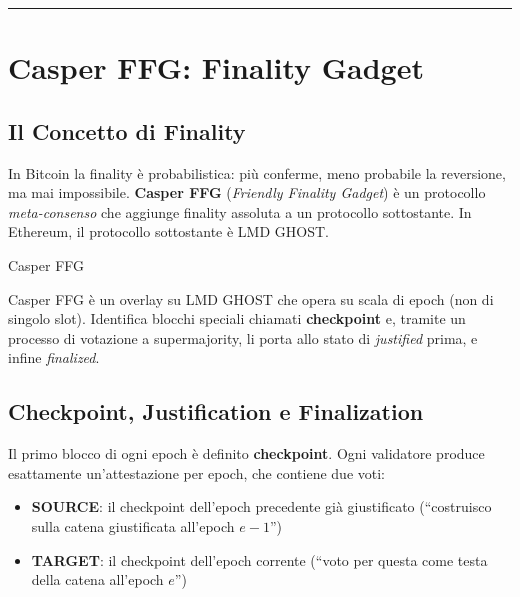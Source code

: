 \documentclass[
  italian,
  openany]{book}
\providecommand{\tightlist}{%
  \setlength{\itemsep}{0pt}\setlength{\parskip}{0pt}}
\begin{document}
\begin{center}\rule{0.5\linewidth}{0.5pt}\end{center}

\section{Casper FFG: Finality Gadget}\label{casper-ffg-finality-gadget}

\subsection{Il Concetto di Finality}\label{il-concetto-di-finality}

In Bitcoin la finality è probabilistica: più conferme, meno probabile la
reversione, ma mai impossibile. \textbf{Casper FFG} (\emph{Friendly
Finality Gadget}) è un protocollo \emph{meta-consenso} che aggiunge
finality assoluta a un protocollo sottostante. In Ethereum, il
protocollo sottostante è LMD GHOST.

\begin{calloutdefinition}{Casper FFG}

Casper FFG è un overlay su LMD GHOST che opera su scala di epoch (non di
singolo slot). Identifica blocchi speciali chiamati \textbf{checkpoint}
e, tramite un processo di votazione a supermajority, li porta allo stato
di \emph{justified} prima, e infine \emph{finalized}.

\end{calloutdefinition}

\subsection{Checkpoint, Justification e
Finalization}\label{checkpoint-justification-e-finalization}

Il primo blocco di ogni epoch è definito \textbf{checkpoint}. Ogni
validatore produce esattamente un'attestazione per epoch, che contiene
due voti:

\begin{itemize}
\tightlist
\item
  \textbf{SOURCE}: il checkpoint dell'epoch precedente già giustificato
  (``costruisco sulla catena giustificata all'epoch \(e-1\)'')
\item
  \textbf{TARGET}: il checkpoint dell'epoch corrente (``voto per questa
  come testa della catena all'epoch \(e\)'')
\end{itemize}
\end{document}
